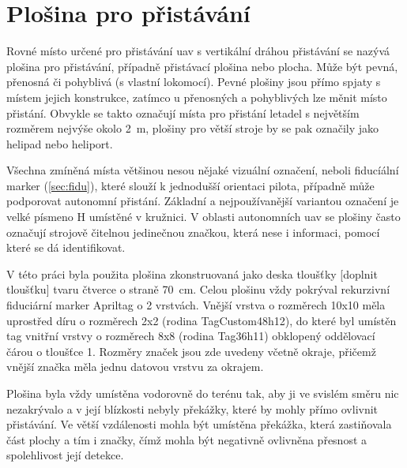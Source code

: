 \chapter{Plošina pro přistávání}
  Rovné místo určené pro přistávání \acrshort{uav} s vertikální dráhou přistávání se nazývá plošina pro přistávání, případně přistávací plošina nebo plocha. Může být pevná, přenosná či pohyblivá (s vlastní lokomocí). Pevné plošiny jsou přímo spjaty s místem jejich konstrukce, zatímco u přenosných a pohyblivých lze měnit místo přistání. Obvykle se takto označují místa pro přistání letadel s největším rozměrem nejvýše okolo 2~m, plošiny pro větší stroje by se pak označily jako helipad nebo heliport.

  Všechna zmíněná místa většinou nesou nějaké vizuální označení, neboli fiducíální marker (\cref{sec:fidu}), které slouží k jednodušší orientaci pilota, případně může podporovat autonomní přistání. Základní a nejpoužívanější variantou označení je velké písmeno H umístěné v kružnici. V oblasti autonomních \acrshort{uav} se plošiny často označují strojově čitelnou jedinečnou značkou, která nese i informaci, pomocí které se dá identifikovat.

  V této práci byla použita plošina zkonstruovaná jako deska tloušťky [doplnit tloušťku] tvaru čtverce o straně 70~cm. Celou plošinu vždy pokrýval rekurzivní fiduciární marker Apriltag o 2 vrstvách. Vnější vrstva o rozměrech 10x10 měla uprostřed díru o rozměrech 2x2 (rodina TagCustom48h12), do které byl umístěn tag vnitřní vrstvy o rozměrech 8x8 (rodina Tag36h11) obklopený oddělovací čárou o tloušťce 1. Rozměry značek jsou zde uvedeny včetně okraje, přičemž vnější značka měla jednu datovou vrstvu za okrajem.
  
  Plošina byla vždy umístěna vodorovně do terénu tak, aby ji ve svislém směru nic nezakrývalo a v její blízkosti nebyly překážky, které by mohly přímo ovlivnit přistávání. Ve větší vzdálenosti mohla být umístěna překážka, která zastiňovala část plochy a tím i značky, čímž mohla být negativně ovlivněna přesnost a spolehlivost její detekce.
